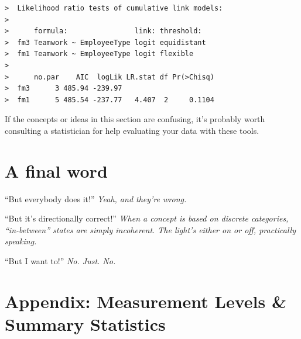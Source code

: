 \documentclass[]{book}
\begin{document}
\begin{verbatim}
>  Likelihood ratio tests of cumulative link models:
>   
>      formula:                link: threshold: 
>  fm3 Teamwork ~ EmployeeType logit equidistant
>  fm1 Teamwork ~ EmployeeType logit flexible   
>  
>      no.par    AIC  logLik LR.stat df Pr(>Chisq)
>  fm3      3 485.94 -239.97                      
>  fm1      5 485.54 -237.77   4.407  2     0.1104
\end{verbatim}

If the concepts or ideas in this section are confusing, it's probably
worth consulting a statistician for help evaluating your data with these
tools.

\chapter{A final word}\label{a-final-word}

``But everybody does it!'' \emph{Yeah, and they're wrong.}

``But it's directionally correct!'' \emph{When a concept is based on
discrete categories, ``in-between'' states are simply incoherent. The
light's either on or off, practically speaking.}

``But I want to!'' \emph{No. Just. No.}

\chapter*{Appendix: Measurement Levels \& Summary
Statistics}\label{appendix-measurement-levels-summary-statistics}
\end{document}
